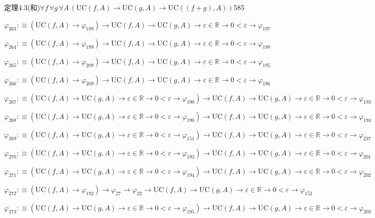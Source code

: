 \begin{fullproof}{定理4.3(和)}{$\forall f\,\forall g\,\forall A\,(\mathrm{UC}(f,A) \to \mathrm{UC}(g,A) \to \mathrm{UC}((f + g),A))$}{585}
\begin{abbrevlist}
\item $\varphi_{263} :\equiv (\mathrm{UC}(f,A) \to \varphi_{199}) \to \mathrm{UC}(f,A) \to \mathrm{UC}(g,A) \to \varepsilon \in \mathbb{R} \to 0 < \varepsilon \to \varphi_{197}$
\item $\varphi_{264} :\equiv (\mathrm{UC}(f,A) \to \varphi_{199}) \to \mathrm{UC}(f,A) \to \mathrm{UC}(g,A) \to \varepsilon \in \mathbb{R} \to 0 < \varepsilon \to \varphi_{198}$
\item $\varphi_{265} :\equiv (\mathrm{UC}(f,A) \to \varphi_{209}) \to \mathrm{UC}(f,A) \to \mathrm{UC}(g,A) \to \varepsilon \in \mathbb{R} \to 0 < \varepsilon \to \varphi_{195}$
\item $\varphi_{266} :\equiv (\mathrm{UC}(f,A) \to \varphi_{209}) \to \mathrm{UC}(f,A) \to \mathrm{UC}(g,A) \to \varepsilon \in \mathbb{R} \to 0 < \varepsilon \to \varphi_{196}$
\item $\varphi_{267} :\equiv (\mathrm{UC}(f,A) \to \mathrm{UC}(g,A) \to \varepsilon \in \mathbb{R} \to 0 < \varepsilon \to \varphi_{190}) \to \mathrm{UC}(f,A) \to \mathrm{UC}(g,A) \to \varepsilon \in \mathbb{R} \to 0 < \varepsilon \to \varphi_{193}$
\item $\varphi_{268} :\equiv (\mathrm{UC}(f,A) \to \mathrm{UC}(g,A) \to \varepsilon \in \mathbb{R} \to 0 < \varepsilon \to \varphi_{190}) \to \mathrm{UC}(f,A) \to \mathrm{UC}(g,A) \to \varepsilon \in \mathbb{R} \to 0 < \varepsilon \to \varphi_{194}$
\item $\varphi_{269} :\equiv (\mathrm{UC}(f,A) \to \mathrm{UC}(g,A) \to \varepsilon \in \mathbb{R} \to 0 < \varepsilon \to \varphi_{151}) \to \mathrm{UC}(f,A) \to \mathrm{UC}(g,A) \to \varepsilon \in \mathbb{R} \to 0 < \varepsilon \to \varphi_{237}$
\item $\varphi_{270} :\equiv (\mathrm{UC}(f,A) \to \mathrm{UC}(g,A) \to \varepsilon \in \mathbb{R} \to 0 < \varepsilon \to \varphi_{193}) \to \mathrm{UC}(f,A) \to \mathrm{UC}(g,A) \to \varepsilon \in \mathbb{R} \to 0 < \varepsilon \to \varphi_{201}$
\item $\varphi_{271} :\equiv (\mathrm{UC}(f,A) \to \mathrm{UC}(g,A) \to \varepsilon \in \mathbb{R} \to 0 < \varepsilon \to \varphi_{194}) \to \mathrm{UC}(f,A) \to \mathrm{UC}(g,A) \to \varepsilon \in \mathbb{R} \to 0 < \varepsilon \to \varphi_{202}$
\item $\varphi_{272} :\equiv (\mathrm{UC}(f,A) \to \varphi_{192}) \to \varphi_{27} \to \varphi_{22} \to \mathrm{UC}(f,A) \to \mathrm{UC}(g,A) \to \varepsilon \in \mathbb{R} \to 0 < \varepsilon \to \varphi_{152}$
\item $\varphi_{273} :\equiv (\mathrm{UC}(f,A) \to \mathrm{UC}(g,A) \to \varepsilon \in \mathbb{R} \to 0 < \varepsilon \to \varphi_{195}) \to \mathrm{UC}(f,A) \to \mathrm{UC}(g,A) \to \varepsilon \in \mathbb{R} \to 0 < \varepsilon \to \varphi_{203}$

\end{abbrevlist}
\end{fullproof}
